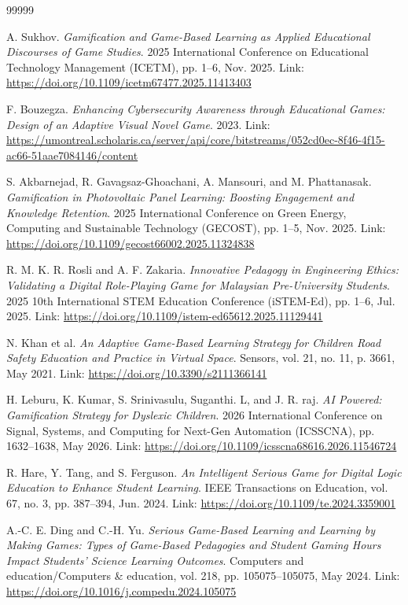 \documentclass[12pt,a4paper]{report}
\begin{document}
\begin{thebibliography}{99999}

 A. Sukhov. \textit{Gamification and Game-Based Learning as Applied Educational Discourses of Game Studies}. 2025 International Conference on Educational Technology Management (ICETM), pp. 1–6, Nov. 2025. Link: \url{https://doi.org/10.1109/icetm67477.2025.11413403}

 F. Bouzegza. \textit{Enhancing Cybersecurity Awareness through Educational Games: Design of an Adaptive Visual Novel Game}. 2023. Link: \url{https://umontreal.scholaris.ca/server/api/core/bitstreams/052cd0ec-8f46-4f15-ac66-51aae7084146/content}

 S. Akbarnejad, R. Gavagsaz-Ghoachani, A. Mansouri, and M. Phattanasak. \textit{Gamification in Photovoltaic Panel Learning: Boosting Engagement and Knowledge Retention}. 2025 International Conference on Green Energy, Computing and Sustainable Technology (GECOST), pp. 1–5, Nov. 2025. Link: \url{https://doi.org/10.1109/gecost66002.2025.11324838}

 R. M. K. R. Rosli and A. F. Zakaria. \textit{Innovative Pedagogy in Engineering Ethics: Validating a Digital Role-Playing Game for Malaysian Pre-University Students}. 2025 10th International STEM Education Conference (iSTEM-Ed), pp. 1–6, Jul. 2025. Link: \url{https://doi.org/10.1109/istem-ed65612.2025.11129441}

 N. Khan et al. \textit{An Adaptive Game-Based Learning Strategy for Children Road Safety Education and Practice in Virtual Space}. Sensors, vol. 21, no. 11, p. 3661, May 2021. Link: \url{https://doi.org/10.3390/s2111366141}

 H. Leburu, K. Kumar, S. Srinivasulu, Suganthi. L, and J. R. raj. \textit{AI Powered: Gamification Strategy for Dyslexic Children}. 2026 International Conference on Signal, Systems, and Computing for Next-Gen Automation (ICSSCNA), pp. 1632–1638, May 2026. Link: \url{https://doi.org/10.1109/icsscna68616.2026.11546724}

 R. Hare, Y. Tang, and S. Ferguson. \textit{An Intelligent Serious Game for Digital Logic Education to Enhance Student Learning}. IEEE Transactions on Education, vol. 67, no. 3, pp. 387–394, Jun. 2024. Link: \url{https://doi.org/10.1109/te.2024.3359001}

 A.-C. E. Ding and C.-H. Yu. \textit{Serious Game-Based Learning and Learning by Making Games: Types of Game-Based Pedagogies and Student Gaming Hours Impact Students' Science Learning Outcomes}. Computers and education/Computers \& education, vol. 218, pp. 105075–105075, May 2024. Link: \url{https://doi.org/10.1016/j.compedu.2024.105075}


\end{thebibliography}
\end{document}
